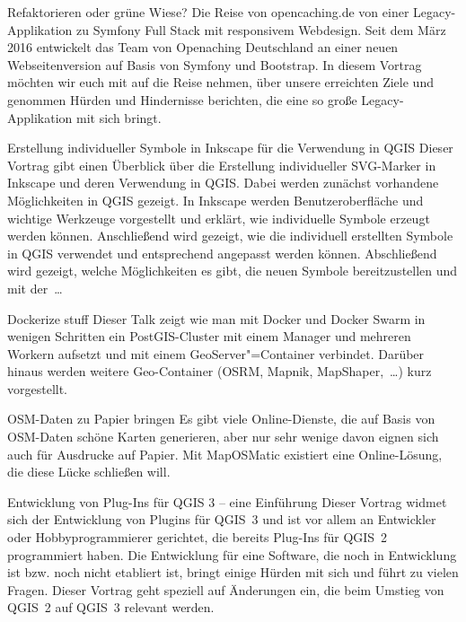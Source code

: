 %
{Refaktorieren oder grüne Wiese?}%
{Die Reise von opencaching.de von einer Legacy-Applikation zu Symfony Full Stack mit \mbox{responsivem} Webdesign.}%
{%
Seit dem März 2016 entwickelt das Team von Openaching Deutschland an einer neuen Webseitenversion
auf Basis von Symfony und Bootstrap. In diesem Vortrag möchten wir euch mit auf die Reise nehmen,
über unsere erreichten Ziele und genommen Hürden und Hindernisse berichten, die eine so große
Legacy-Applikation mit sich bringt.%
}




%
{Erstellung individueller Symbole in Inkscape für die Verwendung in QGIS}%
{}%
{%
Dieser Vortrag gibt einen Überblick über die Erstellung individueller SVG-Marker in Inkscape und
deren Verwendung in QGIS. Dabei werden zunächst vorhandene Möglichkeiten in QGIS gezeigt. In
Inkscape werden Benutzeroberfläche und wichtige Werkzeuge vorgestellt und erklärt, wie individuelle
Symbole erzeugt werden können. Anschließend wird gezeigt, wie die individuell erstellten Symbole in
QGIS verwendet und entsprechend angepasst werden können.  Abschließend wird gezeigt, welche
Möglichkeiten es gibt, die neuen Symbole bereitzustellen und  mit der~\dots%
}

%
{Dockerize stuff}%
{}%
{%
Dieser Talk zeigt wie man mit Docker und Docker Swarm in wenigen Schritten ein PostGIS-Cluster mit
einem Manager und mehreren Workern aufsetzt und mit einem GeoServer"=Container verbindet. Darüber
hinaus werden weitere Geo-Container (OSRM, Mapnik, MapShaper,~\dots) kurz vorgestellt.%
}

%
{OSM-Daten zu Papier bringen}%
{}%
{%
Es gibt viele Online-Dienste, die auf Basis von OSM-Daten schöne Karten generieren, aber nur sehr
wenige davon eignen sich auch für Ausdrucke auf Papier. Mit MapOSMatic existiert eine
Online-Lösung, die diese Lücke schließen will.%
}


%
{Entwicklung von Plug-Ins für QGIS 3 -- eine Einführung}%
{}%
{%
Dieser Vortrag widmet sich der Entwicklung von Plugins für QGIS~3 und ist vor allem an Entwickler
oder Hobbyprogrammierer gerichtet, die bereits Plug-Ins für QGIS~2 programmiert haben. Die
Entwicklung für eine Software, die noch in Entwicklung ist bzw. noch nicht etabliert ist, bringt
einige Hürden mit sich und führt zu vielen Fragen. Dieser Vortrag geht speziell auf Änderungen ein,
die beim Umstieg von QGIS~2 auf QGIS~3 relevant werden.%
}

